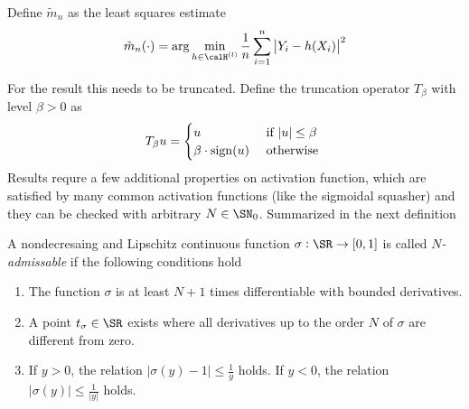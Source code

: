 Define $\tilde{m}_n$ as the least squares estimate 
\begin{equation}
	\label{eq:DLNPR-9}
	\tilde{m}_n(\cdot) = \arg \min_{h\in \calH^{(l)}} \frac{1}{n} \sum_{i=1}^n \left|Y_i - h(X_i)\right|^2
\end{equation}

For the result this needs to be truncated. Define the truncation operator $T_\beta$ with level $\beta > 0$ as 
\[T_\beta u = \begin{cases}
	u &\text{ if }|u|\leq \beta \\
	\beta \cdot \operatorname{sign}(u) &\text{ otherwise }
\end{cases}\]
Results requre a few additional properties on activation function, which are satisfied by many common activation functions (like the sigmoidal squasher) and they can be checked with arbitrary $N \in \SN_0$. Summarized in the next definition
\begin{definition}
	\label{def:DLNPR-3}
	A nondecresaing and Lipschitz continuous function $\sigma: \SR\rightarrow [0,1]$ is called \emph{$N$-admissable} if the following conditions hold
	\begin{enumerate}
		\item The function $\sigma$ is at least $N+1$ times differentiable with bounded derivatives. 
		\item A point $t_\sigma\in\SR$ exists where all derivatives up to the order $N$ of $\sigma$ are different from zero. 
		\item If $y > 0$, the relation $|\sigma(y) - 1| \leq \frac{1}{y}$ holds. If $y < 0$, the relation $|\sigma(y)| \leq \frac{1}{|y|}$ holds.
	\end{enumerate}
\end{definition}
